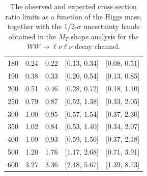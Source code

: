 \begin{table}[!htbp]
\begin{center}
\begin{tabular}{ccccc}
180 & 0.24 & 0.22 & [0.13, 0.34] & [0.08, 0.51] \\
190 & 0.38 & 0.33 & [0.20, 0.54] & [0.13, 0.85] \\
200 & 0.51 & 0.46 & [0.28, 0.72] & [0.18, 1.10] \\
250 & 0.79 & 0.87 & [0.52, 1.38] & [0.33, 2.05] \\
300 & 1.00 & 0.95 & [0.57, 1.54] & [0.37, 2.30] \\
350 & 1.02 & 0.84 & [0.53, 1.40] & [0.34, 2.07] \\
400 & 1.09 & 0.93 & [0.59, 1.50] & [0.37, 2.18] \\
500 & 1.20 & 1.76 & [1.17, 2.68] & [0.71, 3.91] \\
600 & 3.27 & 3.36 & [2.18, 5.67] & [1.39, 8.73] \\
\hline\hline
\end{tabular}
\end{center}
\caption{The observed and expected cross section ratio limits as a function
of the Higgs mass, together with the 1/2-$\sigma$ uncertainty bands obtained in the 
$M_T$ shape analysis for the $WW\rightarrow\ell\nu\ell\nu$ decay channel.}
\label{tab:hww_acls_bayes}
\end{table}

